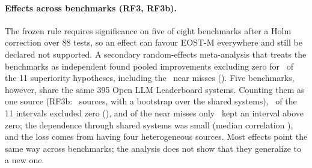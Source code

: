 \paragraph{Effects across benchmarks (RF3, RF3b).} The frozen rule requires significance on
five of eight benchmarks after a Holm correction over 88 tests, so an effect can favour
EOST-M everywhere and still be declared not supported. A secondary random-effects
meta-analysis that treats the benchmarks as independent found pooled improvements excluding
zero for \MetaNExclZero\ of the 11 superiority hypotheses, including the
\MetaNExclZeroUnsup\ near misses (\MetaUnsupList). Five benchmarks, however, share the same
395 Open LLM Leaderboard systems. Counting them as one source (RF3b: \MetaSrcK\ sources, with
a bootstrap over the shared systems), \MetaSrcNExclZero\ of the 11 intervals excluded zero
(\MetaSrcExclList), and of the near misses only \MetaSrcUnsupKeptList\ kept an interval above
zero; the dependence through shared systems was small (median correlation \MetaSrcR), and the
loss comes from having four heterogeneous sources. Most effects point the same way across
benchmarks; the analysis does not show that they generalize to a new one.
